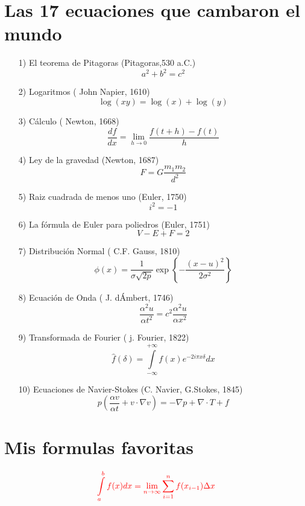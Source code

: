 \documentclass[11pt]{article}
\begin{document}
      \section{Las 17 ecuaciones que cambaron el mundo}
      \begin{itemize}
        \item[1)] El teorema de Pitagoras (Pitagoras,530 a.C.)
        \[
            a^{2}+b^{2} = c^{2} 
        \]
        \item[2)] Logaritmos ( John Napier, 1610)
        \[
            \log{(xy)} = \log{(x)} + \log{(y)}
        \] 
        \item[3)] Cálculo ( Newton, 1668)
        \[
           \dfrac{df}{dx} = \lim\limits_{h \to 0} \dfrac{f(t+h)-f(t)}{h}
        \]
        \item[4)] Ley de la gravedad (Newton, 1687)
        \[
           F = G \dfrac{m_{1}m_{2}}{d^{2}} 
        \]
        \item[5)] Raiz cuadrada de menos uno (Euler, 1750)
        \[
            i^{2} = -1
        \]
        \item[6)] La fórmula de Euler para poliedros (Euler, 1751)
        \[
            V - E + F = 2
        \]
        \item[7)] Distribución Normal ( C.F. Gauss, 1810)
        \[
            \phi{(x)} = \dfrac{1}{\sigma\sqrt{2p}}\exp{\left\{-\dfrac{(x-u)^{2}}{2\sigma^{2}}\right\}}
        \]
        \item[8)] Ecuación de Onda ( J. dÁmbert, 1746)
        \[
            \dfrac{\alpha^{2}u}{\alpha t^{2}} = c^{2} \dfrac{\alpha^{2}u}{\alpha x^{2}}
        \]
        \item[9)] Transformada de Fourier ( j. Fourier, 1822)
        \[
            \hat{f}(\delta) = \int\limits_{-\infty}^{+\infty}f(x) e^{-2i\pi x \delta } dx 
        \]
        \item[10)] Ecuaciones de Navier-Stokes (C. Navier, G.Stokes, 1845)
        \[
            p\left(  \dfrac{\alpha v}{\alpha t} + v\cdot \nabla v \right) = -\nabla p + \nabla \cdot T + f
        \]
      \end{itemize}
      \newpage
      \section{Mis formulas favoritas}

      \begin{equation*}
          \textcolor{red}{\int\limits_{a}^{b}f(x)dx = \lim\limits_{n \to \infty} \sum\limits_{i=1}^{n}f(x_{i-1}) \Delta x}
      \end{equation*}
\end{document}
